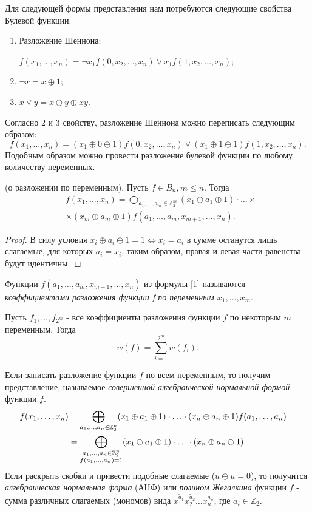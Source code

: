 Для следующей формы представления нам потребуются следующие свойства Булевой функции.
\begin{enumerate}[label=\arabic*),itemsep=0ex, topsep=1ex, parsep=0pt]
    \item Разложение Шеннона:
    
    $f(x_1,\dots,x_n)=\neg x_1f(0,x_2,\dots,x_n)\vee x_1f(1,x_2,\dots,x_n);$
    \item $\neg x = x \oplus 1;$
    \item $x \vee y = x \oplus y \oplus xy.$
\end{enumerate}
Согласно 2 и 3 свойству, разложение Шеннона можно переписать следующим образом:
\[
f(x_1,\dots,x_n)=(x_1 \oplus 0 \oplus 1) f(0,x_2,\dots,x_n)\vee (x_1 \oplus 1 \oplus 1)f(1,x_2,\dots,x_n).
\]
Подобным образом можно провести разложение булевой функции по любому количеству переменных.

\begin{theorem}(о разложении по переменным).
Пусть $f \in B_n, m \leq n.$ Тогда
\begin{equation}
\begin{split}
&f(x_1, \dots, x_n) = \bigoplus_{a_1, \dots, a_m \in \mathbb{Z}_2^m}(x_1 \oplus a_1 \oplus 1) \cdot \ldots \times \\
&\times (x_m \oplus a_m \oplus 1)f(a_1, \dots, a_m, x_{m+1}, \dots, x_n).
\end{split}
\label{1}
\end{equation}
\end{theorem}
\begin{proof} В силу условия $x_i \oplus a_i \oplus 1 = 1 \Leftrightarrow x_i = a_i$ в сумме останутся лишь слагаемые, для которых $a_i = x_i$, таким образом, правая и левая части равенства будут идентичны. 
\end{proof}
Функции $f(a_1, \dots, a_m, x_{m+1}, \dots, x_n)$ из формулы \eqref{1} называются \textit{коэффициентами разложения функции f по переменным $x_1,\dots,x_m$}.
\begin{theorem}
    Пусть $f_1,\dots, f_{2^m}$ - все коэффициенты разложения функции $f$ по некоторым $m$ переменным. Тогда
    \[
    w(f) = \sum_{i=1}^{2^m}w(f_i).
    \]
    \label{th2}
\end{theorem}
Если записать разложение функции $f$ по всем переменным, то получим представление, называемое \textit{совершенной алгебраической нормальной формой} функции $f$.
\begin{align}
f(x_1, \dots, x_n) &= \bigoplus_{a_1, \dots, a_n \in \mathbb{Z}_2^n}(x_1 \oplus a_1 \oplus 1) \cdot \ldots \cdot (x_n \oplus a_n \oplus 1)f(a_1, \dots, a_n) =\notag\\ 
&=\bigoplus_{\substack{a_1, \dots, a_n \in \mathbb{Z}_2^n \\ f(a_1,\dots,a_n) = 1}}(x_1 \oplus a_1 \oplus 1) \cdot \ldots \cdot (x_n \oplus a_n \oplus 1).
\label{2}
\end{align}
Если раскрыть скобки и привести подобные слагаемые ($u\oplus u =0$), то получится \textit{алгебраическая нормальная форма} (АНФ) или \textit{полином Жегалкина} функции $f$ - сумма различных слагаемых (мономов) вида $x_1^{\tilde{a}_1}x_2^{\tilde{a}_2}\dots x_n^{\tilde{a}_n}$, где $\tilde{a}_i \in \mathbb{Z}_2$.

